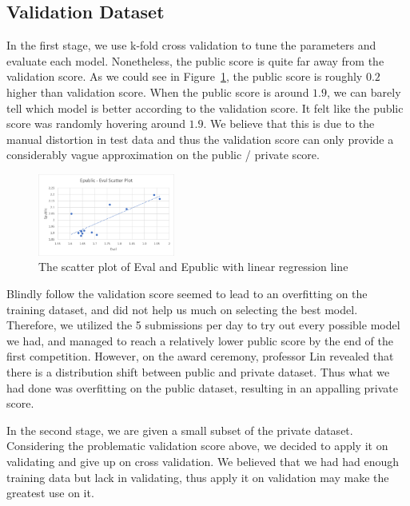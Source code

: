 \documentclass[10pt,letterpaper]{article}
\begin{document}
\subsection{Validation Dataset}

In the first stage, we use k-fold cross validation to tune the parameters and evaluate each model. Nonetheless, the public score is quite far away from the validation score. As we could see in Figure~\ref{fig:EvalEpublicScatter}, the public score is roughly $0.2$ higher than validation score. When the public score is around $1.9$, we can barely tell which model is better according to the validation score. It felt like the public score was randomly hovering around $1.9$. We believe that this is due to the manual distortion in test data and thus the validation score can only provide a considerably vague approximation on the public / private score.

\begin{figure}[h]
	\centering
	\includegraphics[width=0.4\textwidth]{Eval-Epublic-scatter.png}
	\caption{The scatter plot of Eval and Epublic with linear regression line}
	\label{fig:EvalEpublicScatter}
\end{figure}

Blindly follow the validation score seemed to lead to an overfitting on the training dataset, and did not help us much on selecting the best model. Therefore, we utilized the 5 submissions per day to try out every possible model we had, and managed to reach a relatively lower public score by the end of the first competition. However, on the award ceremony, professor Lin revealed that there is a distribution shift between public and private dataset. Thus what we had done was overfitting on the public dataset, resulting in an appalling private score. 

In the second stage, we are given a small subset of the private dataset. Considering the problematic validation score above, we decided to apply it on validating and give up on cross validation. We believed that we had had enough training data but lack in validating, thus apply it on validation may make the greatest use on it. 

\end{document}
